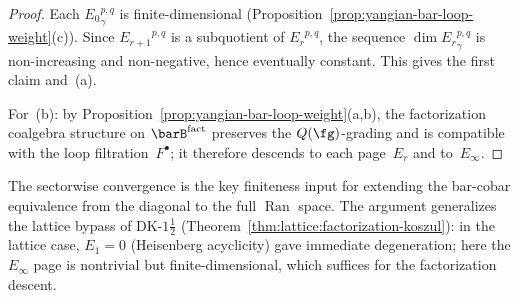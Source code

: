 \begin{proof}
Each ${E_0}^{p,q}_\gamma$ is finite-dimensional
(Proposition~\ref{prop:yangian-bar-loop-weight}(c)).  Since
${E_{r+1}}^{p,q}$ is a subquotient of ${E_r}^{p,q}$, the sequence
$\dim {E_r}^{p,q}_\gamma$ is non-increasing and non-negative, hence
eventually constant.  This gives the first claim and~(a).

For~(b): by Proposition~\ref{prop:yangian-bar-loop-weight}(a,b),
the factorization coalgebra structure on $\barB^{\mathrm{fact}}$
preserves the $Q(\fg)$-grading and is compatible with the loop
filtration~$F^\bullet$; it therefore descends to each page~$E_r$
and to~$E_\infty$.
\end{proof}

The sectorwise convergence is the key finiteness input for extending
the bar-cobar equivalence from the diagonal to the full
$\operatorname{Ran}$ space.  The argument generalizes the
lattice bypass of DK-$1\frac{1}{2}$
(Theorem~\ref{thm:lattice:factorization-koszul}): in the lattice
case, $E_1 = 0$ (Heisenberg acyclicity) gave immediate degeneration;
here the $E_\infty$ page is nontrivial but finite-dimensional, which
suffices for the factorization descent.

